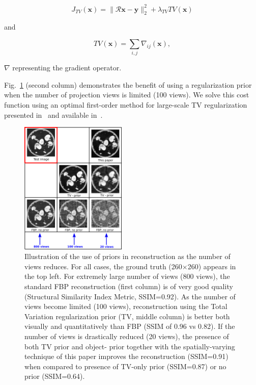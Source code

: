 \documentclass[journal]{IEEEtran}
\begin{document}
 \begin{equation}
   J_{TV}(\boldsymbol{x}) = \lVert\boldsymbol{\mathcal{R}x}- \boldsymbol{y}\rVert_2^2 + \lambda_{TV}TV(\boldsymbol{x})
   \label{Eq:simple_TV}
 \end{equation}

 and 

  \begin{equation}
   TV(\boldsymbol{x}) = \sum_{i,j}\nabla_{ij}(\boldsymbol{x}),
   \label{Eq:definition_TV}
\end{equation}

  $\nabla$ representing the gradient operator.
  
 Fig.~\ref{fig:story} (second column) demonstrates the benefit of
 using a regularization prior when the number of projection views is
 limited (100 views).  We solve this cost function using an optimal
 first-order method for large-scale TV regularization presented
 in~\cite{TVReg} and available in~\cite{TVReg-lib}.


 \begin{figure}[t]
\centering
	\includegraphics[width=0.45\textwidth]{../images/story/post_TCI/story.png}
        \caption{Illustration of the use of priors in reconstruction
          as the number of views reduces. For all cases, the ground
          truth (260$\times$260) appears in the top left.  For
          extremely large number of views (800 views), the standard
          FBP reconstruction (first column) is of very good quality
          (Structural Similarity Index Metric, SSIM=0.92). As the
          number of views become limited (100 views), reconstruction
          using the Total Variation regularization prior (TV, middle
          column) is better both visually and quantitatively than FBP
          (SSIM of 0.96 vs 0.82). If the number of views is
          drastically reduced (20 views), the presence of both TV
          prior and object- prior together with the spatially-varying
          technique of this paper improves the reconstruction
          (SSIM=0.91) when compared to presence of TV-only prior
          (SSIM=0.87) or no prior (SSIM=0.64).}
 \label{fig:story}
 \end{figure} 
\end{document}
